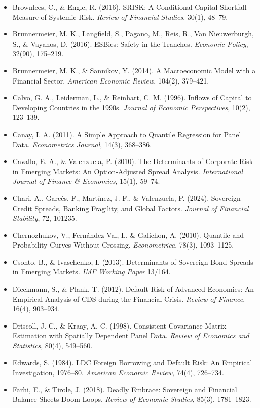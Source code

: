 \documentclass[5p,times,twocolumn,authoryear]{elsarticle}
\begin{document}
\begin{itemize}
    \item Brownlees, C., \& Engle, R. (2016). SRISK: A Conditional Capital Shortfall Measure of Systemic Risk. \textit{Review of Financial Studies}, 30(1), 48–79.
    \item Brunnermeier, M. K., Langfield, S., Pagano, M., Reis, R., Van Nieuwerburgh, S., \& Vayanos, D. (2016). ESBies: Safety in the Tranches. \textit{Economic Policy}, 32(90), 175–219.
    \item Brunnermeier, M. K., \& Sannikov, Y. (2014). A Macroeconomic Model with a Financial Sector. \textit{American Economic Review}, 104(2), 379–421.
    \item Calvo, G. A., Leiderman, L., \& Reinhart, C. M. (1996). Inflows of Capital to Developing Countries in the 1990s. \textit{Journal of Economic Perspectives}, 10(2), 123–139.
    \item Canay, I. A. (2011). A Simple Approach to Quantile Regression for Panel Data. \textit{Econometrics Journal}, 14(3), 368–386.
    \item Cavallo, E. A., \& Valenzuela, P. (2010). The Determinants of Corporate Risk in Emerging Markets: An Option-Adjusted Spread Analysis. \textit{International Journal of Finance \& Economics}, 15(1), 59–74.
    \item Chari, A., Garcés, F., Martínez, J. F., \& Valenzuela, P. (2024). Sovereign Credit Spreads, Banking Fragility, and Global Factors. \textit{Journal of Financial Stability}, 72, 101235.
    \item Chernozhukov, V., Fernández-Val, I., \& Galichon, A. (2010). Quantile and Probability Curves Without Crossing. \textit{Econometrica}, 78(3), 1093–1125.
    \item Csonto, B., \& Ivaschenko, I. (2013). Determinants of Sovereign Bond Spreads in Emerging Markets. \textit{IMF Working Paper} 13/164.
    \item Dieckmann, S., \& Plank, T. (2012). Default Risk of Advanced Economies: An Empirical Analysis of CDS during the Financial Crisis. \textit{Review of Finance}, 16(4), 903–934.
    \item Driscoll, J. C., \& Kraay, A. C. (1998). Consistent Covariance Matrix Estimation with Spatially Dependent Panel Data. \textit{Review of Economics and Statistics}, 80(4), 549–560.
    \item Edwards, S. (1984). LDC Foreign Borrowing and Default Risk: An Empirical Investigation, 1976–80. \textit{American Economic Review}, 74(4), 726–734.
    \item Farhi, E., \& Tirole, J. (2018). Deadly Embrace: Sovereign and Financial Balance Sheets Doom Loops. \textit{Review of Economic Studies}, 85(3), 1781–1823.

\end{itemize}
\end{document}
